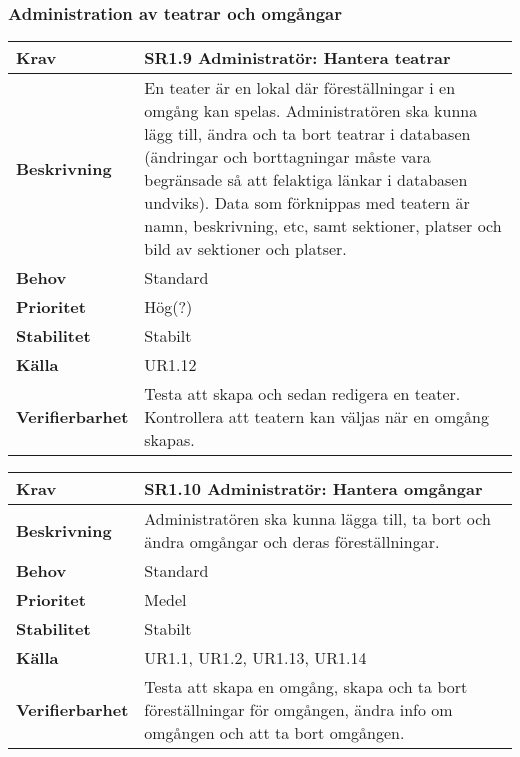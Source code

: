 \documentclass[a4paper, twoside, 11pt, titlepage]{article}
\begin{document}
		\subsubsection{Administration av teatrar och omgångar}


		\begin{tabular} { p{2.6cm} p{12.5cm} }
			\hline
			\sffamily\textbf{Krav} & \sffamily\textbf{SR1.9 Administratör: Hantera teatrar } \\
			\hline
			\sffamily\textbf{Beskrivning} & En teater är en lokal där föreställningar i en omgång kan spelas. Administratören ska kunna lägg till, ändra och ta bort teatrar i databasen (ändringar och borttagningar måste vara begränsade så att felaktiga länkar i databasen undviks). Data som förknippas med teatern är namn, beskrivning, etc, samt sektioner, platser och bild av sektioner och platser.  \\
			\hline
			\sffamily\textbf{Behov} & Standard  \\
			\hline
			\sffamily\textbf{Prioritet} & Hög(?)  \\
			\hline
			\sffamily\textbf{Stabilitet} & Stabilt  \\
			\hline
			\sffamily\textbf{Källa} & UR1.12  \\
			\hline
			\sffamily\textbf{Verifierbarhet} & Testa att skapa och sedan redigera en teater. Kontrollera att teatern kan väljas när en omgång skapas.  \\
			\hline
		\end{tabular}
		\vspace{6mm}

		\begin{tabular} { p{2.6cm} p{12.5cm} }
			\hline
			\sffamily\textbf{Krav} & \sffamily\textbf{SR1.10 Administratör: Hantera omgångar } \\
			\hline
			\sffamily\textbf{Beskrivning} & Administratören ska kunna lägga till, ta bort och ändra omgångar och deras föreställningar.  \\
			\hline
			\sffamily\textbf{Behov} & Standard  \\
			\hline
			\sffamily\textbf{Prioritet} & Medel  \\
			\hline
			\sffamily\textbf{Stabilitet} & Stabilt  \\
			\hline
			\sffamily\textbf{Källa} & UR1.1, UR1.2, UR1.13, UR1.14  \\
			\hline
			\sffamily\textbf{Verifierbarhet} & Testa att skapa en omgång, skapa och ta bort föreställningar för omgången, ändra info om omgången och att ta bort omgången.  \\
			\hline
		\end{tabular}
\end{document}
